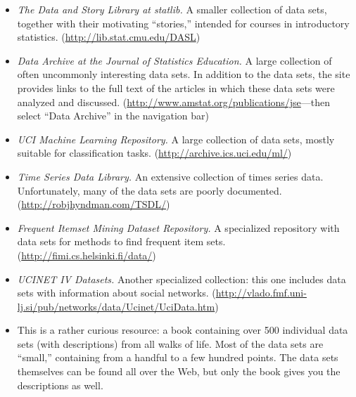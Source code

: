 \begin{itemize}
\item {\it The Data and Story Library at statlib.} A smaller collection of
  data sets, together with their motivating ``stories,'' intended for
  courses in introductory statistics.
  (\url{http://lib.stat.cmu.edu/DASL})

\item {\it Data Archive at the Journal of Statistics Education.} A large
  collection of often uncommonly interesting data sets. In addition to
  the data sets, the site provides links to the full text of the
  articles in which these data sets were analyzed and discussed.
  (\url{http://www.amstat.org/publications/jse}---then select ``Data
  Archive'' in the navigation bar)

\item {\it UCI Machine Learning Repository.} A large collection of data
  sets, mostly suitable for classification tasks.
  (\url{http://archive.ics.uci.edu/ml/})

\item {\it Time Series Data Library.} An extensive collection of times
  series data. Unfortunately, many of the data sets are 
  poorly documented. (\url{http://robjhyndman.com/TSDL/})

\item {\it Frequent Itemset Mining Dataset Repository.} A specialized 
  repository with data sets for methods to find frequent item sets.
  (\url{http://fimi.cs.helsinki.fi/data/})

\item {\it UCINET IV Datasets.} Another specialized collection: this one
  includes data sets with information about social networks.
  (\url{http://vlado.fmf.uni-lj.si/pub/networks/data/Ucinet/UciData.htm})

\item {}
  This is a rather curious resource: a book containing over 500
  individual data sets (with descriptions) from all walks of life.
  Most of the data sets are ``small,'' containing from a handful to a
  few hundred points. The data sets themselves can be found all over
  the Web, but only the book gives you the descriptions as well.
\end{itemize}

